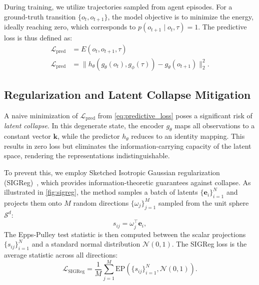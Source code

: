 During training, we utilize trajectories sampled from agent episodes. For a ground-truth transition $\{ o_t, o_{t+1} \}$, the model objective is to minimize the energy, ideally reaching zero, which corresponds to $p(o_{t+1} \mid o_t, \tau) = 1$. The predictive loss is thus defined as:
\begin{subequations}
	\begin{align}
		\mathcal{L}_\mathrm{pred} & = E(o_t, o_{t+1}, \tau)                                                                                       \\
		\mathcal{L}_\mathrm{pred} & = \| h_\theta\left(g_\theta(o_t), g_\phi(\tau)\right) - g_\theta(o_{t+1}) \|^2_2 . \label{eq:predictive_loss}
	\end{align}
	\label{eq:pred_loss}
\end{subequations}

\subsection{Regularization and Latent Collapse Mitigation}
\label{sec:method_reg_collapse_prev}

A naive minimization of \( \mathcal{L}_\mathrm{pred} \) from \cref{eq:predictive_loss} poses a significant risk of \textit{latent collapse}. In this degenerate state, the encoder $g_\theta$ maps all observations to a constant vector $\mathbf{k}$, while the predictor $h_\theta$ reduces to an identity mapping. This results in zero loss but eliminates the information-carrying capacity of the latent space, rendering the representations indistinguishable.

To prevent this, we employ Sketched Isotropic Gaussian regularization (SIGReg)~\cite{lejepa}, which provides information-theoretic guarantees against collapse. As illustrated in \cref{fig:sigreg}, the method samples a batch of latents \( \{\mathbf{e}_i\}_{i=1}^{N} \) and projects them onto $M$ random directions \( \{\omega_j\}_{j=1}^{M} \) sampled from the unit sphere \( \mathcal{S}^d \):
\begin{equation}
	s_{ij} = \omega_j^\top \mathbf{e}_i ,
	\label{eq:projection}
\end{equation}
The Epps-Pulley test statistic is then computed between the scalar projections $\{s_{ij}\}_{i=1}^{N}$ and a standard normal distribution \( \mathcal{N}(0, 1) \). The SIGReg loss is the average statistic across all directions:
\begin{equation}
	\mathcal{L}_\mathrm{SIGReg} = \frac{1}{M} \sum_{j=1}^{M}{\mathrm{EP}\left(\{s_{ij}\}_{i=1}^{N}, \mathcal{N}(0, 1)\right)} .
	\label{eq:loss_sigreg}
\end{equation}

